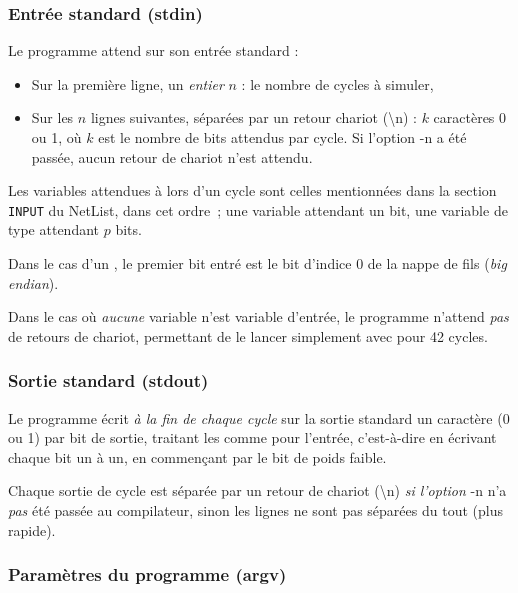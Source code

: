 \documentclass[11pt,a4paper]{article}
\begin{document}
\subsubsection*{Entrée standard (stdin)}

Le programme attend sur son entrée standard :

\begin{itemize}
\item Sur la première ligne, un \emph{entier} $n$ : le nombre de cycles à simuler,
\item Sur les $n$ lignes suivantes, séparées par un retour chariot (\textbackslash n) : $k$ caractères 0 ou 1, où $k$ est le nombre de bits attendus par cycle. Si l'option -n a été passée, aucun retour de chariot n'est attendu.
\end{itemize}

Les variables attendues à lors d'un cycle sont celles mentionnées dans la section \lstinline`INPUT` du NetList, dans cet ordre~; une variable  attendant un bit, une variable de type  attendant $p$ bits.

Dans le cas d'un , le premier bit entré est le bit d'indice 0 de la nappe de fils (\emph{big endian}).

Dans le cas où \emph{aucune} variable n'est variable d'entrée, le programme n'attend \emph{pas} de retours de chariot, permettant de le lancer simplement avec  pour 42 cycles.

\subsubsection*{Sortie standard (stdout)}

Le programme écrit \emph{à la fin de chaque cycle} sur la sortie standard un caractère (0 ou 1) par bit de sortie, traitant les  comme pour l'entrée, c'est-à-dire en écrivant chaque bit un à un, en commençant par le bit de poids faible.

Chaque sortie de cycle est séparée par un retour de chariot (\textbackslash n) \emph{si l'option} -n n'a \emph{pas} été passée au compilateur, sinon les lignes ne sont pas séparées du tout (plus rapide).

\subsubsection*{Paramètres du programme (argv)}
\end{document}
